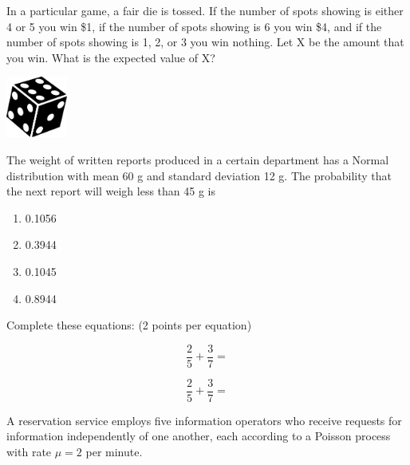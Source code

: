 \documentclass[letterpaper,12pt,addpoints]{exam}
\begin{document}
\clearpage
\begin{questions}
\question [3] In a particular game, a fair die is tossed.  If the number of spots showing is either 4 or 5 you win \$1, if the number of spots showing is 6 you win \$4, and if the number of spots showing is 1, 2, or 3 you win nothing.  Let X be the amount that you win. 
What is the expected value of X?

\vspace{0.2cm}
\begin{center}
\includegraphics[width=2cm]{dice_simple.png}
\end{center}


\vspace{2.7in}


\question[4]
 The weight of written reports produced in a certain department has a Normal distribution with mean 60 g and standard deviation 12 g. The probability that the next report will weigh less than 45 g is

\begin{enumerate}
\item 0.1056
\item  0.3944
\item  0.1045
\item  0.8944
\end{enumerate}


\clearpage
\question [4] Complete these equations: (2 points per equation)

\begin{equation*}
\frac{2}{5} + \frac{3}{7} = 
\end{equation*}


\begin{equation*}
\frac{2}{5} + \frac{3}{7} = 
\end{equation*}

\clearpage
\question A reservation service employs five information operators who receive requests for information independently of one another, each according to a Poisson process with rate $\mu=2$ per minute.

\end{questions}
\end{document}
